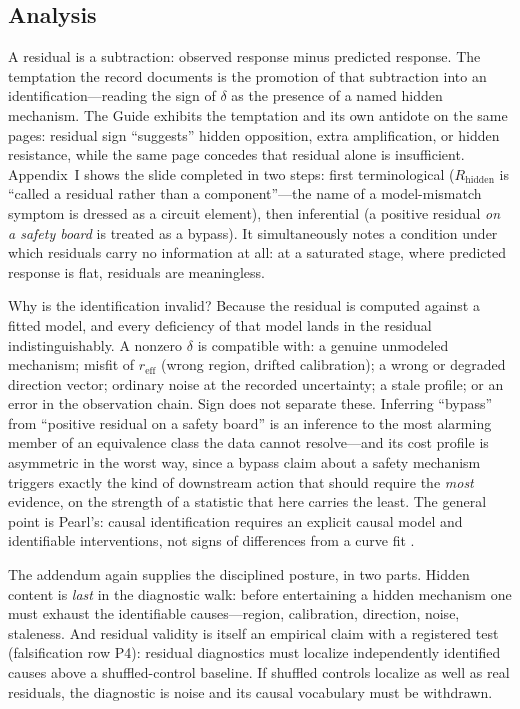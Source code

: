\subsection{Analysis}

A residual is a subtraction: observed response minus predicted response. The
temptation the record documents is the promotion of that subtraction into an
identification---reading the sign of $\delta$ as the presence of a named
hidden mechanism. The Guide exhibits the temptation and its own antidote on
the same pages: residual sign ``suggests'' hidden opposition, extra
amplification, or hidden resistance, while the same page concedes that
residual alone is insufficient. Appendix~I shows the slide completed in two
steps: first terminological ($R_{\mathrm{hidden}}$ is ``called a residual
rather than a component''---the name of a model-mismatch symptom is dressed
as a circuit element), then inferential (a positive residual \emph{on a
safety board} is treated as a bypass). It simultaneously notes a condition
under which residuals carry no information at all: at a saturated stage,
where predicted response is flat, residuals are meaningless.

Why is the identification invalid? Because the residual is computed against a
fitted model, and every deficiency of that model lands in the residual
indistinguishably. A nonzero $\delta$ is compatible with: a genuine
unmodeled mechanism; misfit of $r_{\mathrm{eff}}$ (wrong region, drifted
calibration); a wrong or degraded direction vector; ordinary noise at the
recorded uncertainty; a stale profile; or an error in the observation chain.
Sign does not separate these. Inferring ``bypass'' from ``positive residual
on a safety board'' is an inference to the most alarming member of an
equivalence class the data cannot resolve---and its cost profile is
asymmetric in the worst way, since a bypass claim about a safety mechanism
triggers exactly the kind of downstream action that should require the
\emph{most} evidence, on the strength of a statistic that here carries the
least. The general point is Pearl's: causal identification requires an
explicit causal model and identifiable interventions, not signs of
differences from a curve fit \cite{pearl}.

The addendum again supplies the disciplined posture, in two parts. Hidden
content is \emph{last} in the diagnostic walk: before entertaining a hidden
mechanism one must exhaust the identifiable causes---region, calibration,
direction, noise, staleness. And residual validity is itself an empirical
claim with a registered test (falsification row P4): residual diagnostics
must localize independently identified causes above a shuffled-control
baseline. If shuffled controls localize as well as real residuals, the
diagnostic is noise and its causal vocabulary must be withdrawn.

